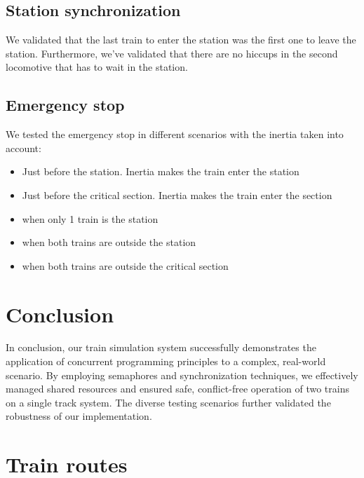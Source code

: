 \documentclass{article}
\begin{document}
    \subsection*{Station synchronization}
        We validated that the last train to enter the station was the first one to leave the station. Furthermore, we've validated that there are no hiccups in the second locomotive that has to wait in the station.
    \subsection*{Emergency stop}
    
    We tested the emergency stop in different scenarios with the inertia taken into account:
    \begin{itemize}
        \item Just before the station. Inertia makes the train enter the station
        \item Just before the critical section. Inertia makes the train enter the section
        \item when only 1 train is the station
        \item when both trains are outside the station
        \item when both trains are outside the critical section
    \end{itemize}
    
    \section{Conclusion}

    In conclusion, our train simulation system successfully demonstrates the application of concurrent programming principles to a complex, real-world scenario. By employing semaphores and synchronization techniques, we effectively managed shared resources and ensured safe, conflict-free operation of two trains on a single track system. The diverse testing scenarios further validated the robustness of our implementation.
    
    \appendix

    \newpage

    \section{Train routes}
\end{document}
